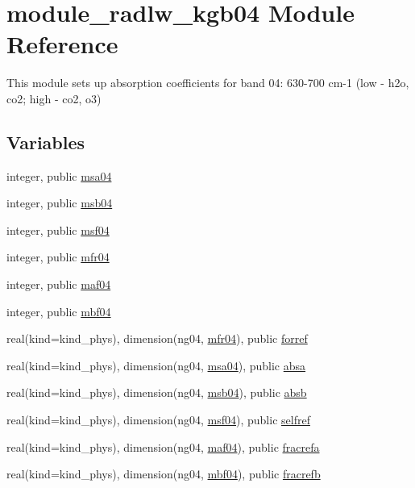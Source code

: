 \hypertarget{namespacemodule__radlw__kgb04}{}\section{module\+\_\+radlw\+\_\+kgb04 Module Reference}
\label{namespacemodule__radlw__kgb04}


This module sets up absorption coefficients for band 04\+: 630-\/700 cm-\/1 (low -\/ h2o, co2; high -\/ co2, o3)  


\subsection*{Variables}
\begin{DoxyCompactItemize}
\item 
integer, public \hyperlink{namespacemodule__radlw__kgb04_ac8c5caff005fd04d01009dd9e977d570}{msa04}
\item 
integer, public \hyperlink{namespacemodule__radlw__kgb04_ab9ce0111a156f7b80f2adaa9f3e84a32}{msb04}
\item 
integer, public \hyperlink{namespacemodule__radlw__kgb04_a4b38dd1165aca80e19697df7ae74a27a}{msf04}
\item 
integer, public \hyperlink{namespacemodule__radlw__kgb04_ab6ae25b4a793bf78ccd504685d639039}{mfr04}
\item 
integer, public \hyperlink{namespacemodule__radlw__kgb04_a60ff35def4e526c7d9cf3ec88bdd4485}{maf04}
\item 
integer, public \hyperlink{namespacemodule__radlw__kgb04_a768f4447809fb11206dce383a121d595}{mbf04}
\item 
real(kind=kind\+\_\+phys), dimension(ng04, \hyperlink{namespacemodule__radlw__kgb04_ab6ae25b4a793bf78ccd504685d639039}{mfr04}), public \hyperlink{namespacemodule__radlw__kgb04_a816fd065291a92c13d026d38a708479b}{forref}
\item 
real(kind=kind\+\_\+phys), dimension(ng04, \hyperlink{namespacemodule__radlw__kgb04_ac8c5caff005fd04d01009dd9e977d570}{msa04}), public \hyperlink{namespacemodule__radlw__kgb04_a8d73bb6971c872e15a24a81d3917167e}{absa}
\item 
real(kind=kind\+\_\+phys), dimension(ng04, \hyperlink{namespacemodule__radlw__kgb04_ab9ce0111a156f7b80f2adaa9f3e84a32}{msb04}), public \hyperlink{namespacemodule__radlw__kgb04_aaacc55911b42c67396b5cdc4318e0d5f}{absb}
\item 
real(kind=kind\+\_\+phys), dimension(ng04, \hyperlink{namespacemodule__radlw__kgb04_a4b38dd1165aca80e19697df7ae74a27a}{msf04}), public \hyperlink{namespacemodule__radlw__kgb04_a696b91ef86ccbda17df10f770797cafa}{selfref}
\item 
real(kind=kind\+\_\+phys), dimension(ng04, \hyperlink{namespacemodule__radlw__kgb04_a60ff35def4e526c7d9cf3ec88bdd4485}{maf04}), public \hyperlink{namespacemodule__radlw__kgb04_ace1d87742e2c543d9b0662e1c7d2b624}{fracrefa}
\item 
real(kind=kind\+\_\+phys), dimension(ng04, \hyperlink{namespacemodule__radlw__kgb04_a768f4447809fb11206dce383a121d595}{mbf04}), public \hyperlink{namespacemodule__radlw__kgb04_ae8d5d56d09dfbe06d918c6b098e3fddf}{fracrefb}
\end{DoxyCompactItemize}


